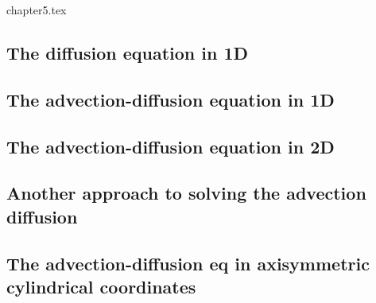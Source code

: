\begin{flushright} {\tiny {\color{gray} chapter5.tex}} \end{flushright}

\subsection{The diffusion equation in 1D} \label{sec:diff1D}  %
\subsection{The advection-diffusion equation in 1D} \label{sec:advec-diff1D} %
\subsection{The advection-diffusion equation in 2D} \label{ss:hte_fem} %
\subsection{Another approach to solving the advection diffusion}\label{ss:hte_diff} 
\subsection{The advection-diffusion eq in axisymmetric cylindrical coordinates}\label{ss:hte_axisym} 
